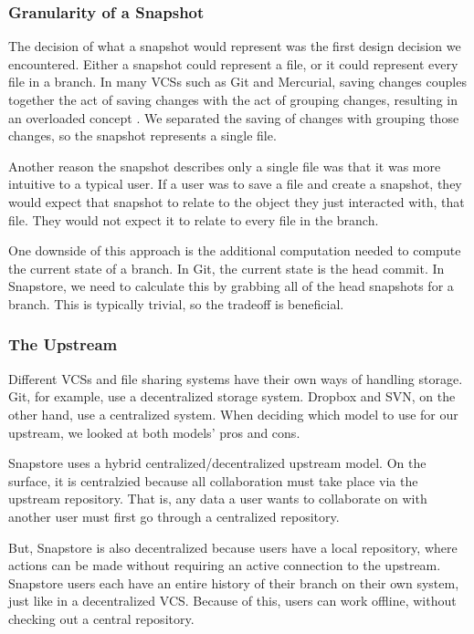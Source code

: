 \subsubsection{Granularity of a Snapshot}

The decision of what a snapshot would represent was the first design decision we encountered. Either a snapshot could represent a file, or it could represent every file in a branch. In many VCSs such as Git and Mercurial, saving changes couples together the act of saving changes with the act of grouping changes, resulting in an overloaded concept \cite{Jackson}. We separated the saving of changes with grouping those changes, so the snapshot represents a single file.

Another reason the snapshot describes only a single file was that it was more intuitive to a typical user. If a user was to save a file and create a snapshot, they would expect that snapshot to relate to the object they just interacted with, that file. They would not expect it to relate to every file in the branch.

One downside of this approach is the additional computation needed to compute the current state of a branch. In Git, the current state is the head commit. In Snapstore, we need to calculate this by grabbing all of the head snapshots for a branch. This is typically trivial, so the tradeoff is beneficial.

\subsubsection{The Upstream}

Different VCSs and file sharing systems have their own ways of handling storage. Git, for example, use a decentralized storage system. Dropbox and SVN, on the other hand, use a centralized system. When deciding which model to use for our upstream, we looked at both models' pros and cons.

Snapstore uses a hybrid centralized/decentralized upstream model. On the surface, it is centralzied because all collaboration must take place via the upstream repository. That is, any data a user wants to collaborate on with another user must first go through a centralized repository.

But, Snapstore is also decentralized because users have a local repository, where actions can be made without requiring an active connection to the upstream. Snapstore users each have an entire history of their branch on their own system, just like in a decentralized VCS. Because of this, users can work offline, without checking out a central repository.

